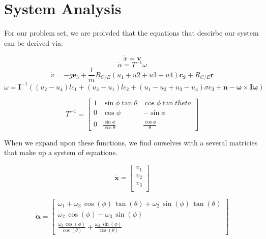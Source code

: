 \documentclass{article}
\begin{document}
\section*{System Analysis}

For our problem set, we are proivded that the equations that descirbe our system can be derived via:

\begin{equation}
    \dot{x} = \boldsymbol{v}
\end{equation}
\begin{equation}
    \dot{\alpha} = T^{-1}\omega
\end{equation}
\begin{equation}
    \dot{v} = -g \boldsymbol{e}_3 + \frac{1}{m}R_{C/E}(u_1+u2+u3+u4)\boldsymbol{c_3}+R_{C/E}\boldsymbol{r}
\end{equation}
\begin{equation}
    \dot{\omega} = \boldsymbol{I}^{-1} ((u_2 - u_4) l c_1 + (u_3-u_1) l c_2 + (u_1 - u_2 + u_3 -u_4) \sigma c_3 + \boldsymbol{n} - \boldsymbol{\omega} \times \boldsymbol{I} \boldsymbol{\omega})
\end{equation}

\begin{equation}
    T^{-1} = \begin{bmatrix}
        1 & \sin{\phi} \tan{\theta} & \cos{\phi}\tan{theta} \\
        0 & \cos{\phi} & -\sin{\phi} \\
        0 & \frac{\sin{\phi}}{\cos{\theta}} & \frac{\cos{\phi}}{\theta}
    \end{bmatrix}
\end{equation}


When we expand upon these functions, we find ourselves with a several matricies that make up a system of equations.

\begin{equation}
    \dot{\boldsymbol{x}} =
    \begin{bmatrix}
        v_1 \\
        v_2 \\
        v_3 \\
    \end{bmatrix}
\end{equation}

\begin{equation}
    \dot{\boldsymbol{\alpha}} =
    \begin{bmatrix}
        \omega_1 +\omega_3 \,\cos \left(\phi \right)\,\tan \left(\theta \right)+\omega_2 \,\sin \left(\phi \right)\,\tan \left(\theta \right)\\
        \omega_2 \,\cos \left(\phi \right)-\omega_3 \,\sin \left(\phi \right)\\
        \frac{\omega_3 \,\cos \left(\phi \right)}{\cos \left(\theta \right)}+\frac{\omega_2 \,\sin \left(\phi \right)}{\cos \left(\theta \right)}
    \end{bmatrix}
\end{equation}
\end{document}
